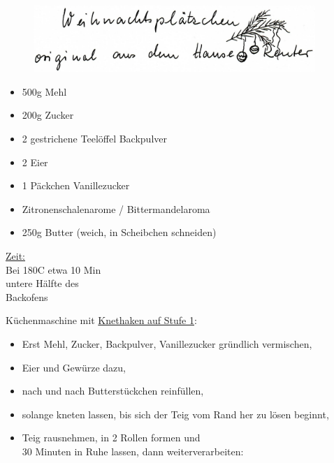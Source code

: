 \documentclass[12pt,utf8,a4paper]{article}
\begin{document}
\pagestyle{empty}

\begin{figure}[htb]
  \centering \leavevmode
  \includegraphics[angle=0,width=0.95\textwidth]{header}
\end{figure}

\begin{minipage}[t]{0.66\textwidth}
  \begin{itemize}
  \item 500g Mehl
  \item 200g Zucker
  \item 2 gestrichene Teelöffel Backpulver
  \item 2 Eier
  \item 1 Päckchen Vanillezucker
  \item Zitronenschalenarome / Bittermandelaroma
  \item 250g Butter (weich, in Scheibchen schneiden)
  \end{itemize}
\end{minipage}
\hfill
\begin{minipage}[t]{0.30\textwidth}
  \underline{Zeit:}\\
  Bei 180\textdegree{}C etwa 10 Min\\
  untere Hälfte des\\
  Backofens
\end{minipage}

\vspace{1.5em}
Küchenmaschine mit \underline{Knethaken auf Stufe 1}:

\begin{itemize}
\item Erst Mehl, Zucker, Backpulver,
  Vanillezucker gründlich
  vermischen,
\item Eier und Gewürze dazu,
\item nach und nach Butterstückchen
  reinfüllen,
\item solange kneten lassen, bis
  sich der Teig vom Rand her zu
  lösen beginnt,
\item Teig rausnehmen, in 2 Rollen
  formen und\\30 Minuten in Ruhe
  lassen, dann weiterverarbeiten:
\end{itemize}
\end{document}
